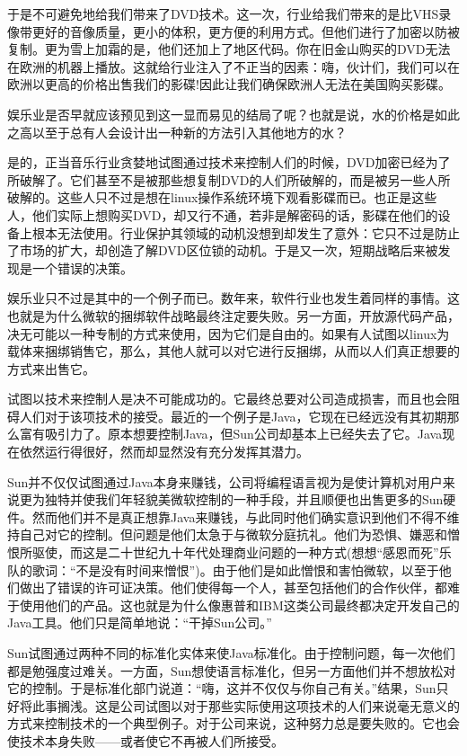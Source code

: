 于是不可避免地给我们带来了DVD技术。这一次，行业给我们带来的是比VHS录像带更好的音像质量，更小的体积，更方便的利用方式。但他们进行了加密以防被复制。更为雪上加霜的是，他们还加上了地区代码。你在旧金山购买的DVD无法在欧洲的机器上播放。这就给行业注入了不正当的因素：嗨，伙计们，我们可以在欧洲以更高的价格出售我们的影碟!因此让我们确保欧洲人无法在美国购买影碟。

娱乐业是否早就应该预见到这一显而易见的结局了呢？也就是说，水的价格是如此之高以至于总有人会设计出一种新的方法引入其他地方的水？

是的，正当音乐行业贪婪地试图通过技术来控制人们的时候，DVD加密已经为了所破解了。它们甚至不是被那些想复制DVD的人们所破解的，而是被另一些人所破解的。这些人只不过是想在linux操作系统环境下观看影碟而已。也正是这些人，他们实际上想购买DVD，却又行不通，若非是解密码的话，影碟在他们的设备上根本无法使用。行业保护其领域的动机没想到却发生了意外：它只不过是防止了市场的扩大，却创造了解DVD区位锁的动机。于是又一次，短期战略后来被发现是一个错误的决策。

娱乐业只不过是其中的一个例子而已。数年来，软件行业也发生着同样的事情。这也就是为什么微软的捆绑软件战略最终注定要失败。另一方面，开放源代码产品，决无可能以一种专制的方式来使用，因为它们是自由的。如果有人试图以linux为载体来捆绑销售它，那么，其他人就可以对它进行反捆绑，从而以人们真正想要的方式来出售它。

试图以技术来控制人是决不可能成功的。它最终总要对公司造成损害，而且也会阻碍人们对于该项技术的接受。最近的一个例子是Java，它现在已经远没有其初期那么富有吸引力了。原本想要控制Java，但Sun公司却基本上已经失去了它。Java现在依然运行得很好，然而却显然没有充分发挥其潜力。

Sun并不仅仅试图通过Java本身来赚钱，公司将编程语言视为是使计算机对用户来说更为独特并使我们年轻貌美微软控制的一种手段，并且顺便也出售更多的Sun硬件。然而他们并不是真正想靠Java来赚钱，与此同时他们确实意识到他们不得不维持自己对它的控制。但问题是他们太急于与微软分庭抗礼。他们为恐惧、嫌恶和憎恨所驱使，而这是二十世纪九十年代处理商业问题的一种方式(想想“感恩而死”乐队的歌词：“不是没有时间来憎恨”)。由于他们是如此憎恨和害怕微软，以至于他们做出了错误的许可证决策。他们使得每一个人，甚至包括他们的合作伙伴，都难于使用他们的产品。这也就是为什么像惠普和IBM这类公司最终都决定开发自己的Java工具。他们只是简单地说：“干掉Sun公司。”

Sun试图通过两种不同的标准化实体来使Java标准化。由于控制问题，每一次他们都是勉强度过难关。一方面，Sun想使语言标准化，但另一方面他们并不想放松对它的控制。于是标准化部门说道：“嗨，这并不仅仅与你自己有关。”结果，Sun只好将此事搁浅。这是公司试图以对于那些实际使用这项技术的人们来说毫无意义的方式来控制技术的一个典型例子。对于公司来说，这种努力总是要失败的。它也会使技术本身失败——或者使它不再被人们所接受。

